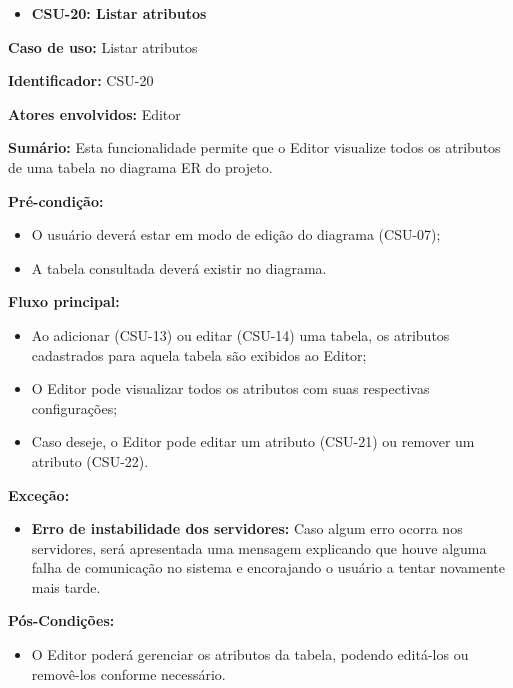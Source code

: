 \vspace{1em}

\begin{itemize}
    \item \textbf{CSU-20: Listar atributos}
\end{itemize}

\textbf{Caso de uso:} Listar atributos

\textbf{Identificador:} CSU-20

\textbf{Atores envolvidos:} Editor

\textbf{Sumário:} Esta funcionalidade permite que o Editor visualize todos os atributos de uma tabela no diagrama ER do projeto.

\textbf{Pré-condição:}
\begin{itemize}
    \item O usuário deverá estar em modo de edição do diagrama (CSU-07);
    \item A tabela consultada deverá existir no diagrama.
\end{itemize}

\textbf{Fluxo principal:}
\begin{itemize}
    \item Ao adicionar (CSU-13) ou editar (CSU-14) uma tabela, os atributos cadastrados para aquela tabela são exibidos ao Editor;
    \item O Editor pode visualizar todos os atributos com suas respectivas configurações;
    \item Caso deseje, o Editor pode editar um atributo (CSU-21) ou remover um atributo (CSU-22).
\end{itemize}

\textbf{Exceção:}
\begin{itemize}
    \item \textbf{Erro de instabilidade dos servidores:} Caso algum erro ocorra nos servidores, será apresentada uma mensagem explicando que houve alguma falha de comunicação no sistema e encorajando o usuário a tentar novamente mais tarde.
\end{itemize}

\textbf{Pós-Condições:}
\begin{itemize}
    \item O Editor poderá gerenciar os atributos da tabela, podendo editá-los ou removê-los conforme necessário.
\end{itemize}

\vspace{1em}

